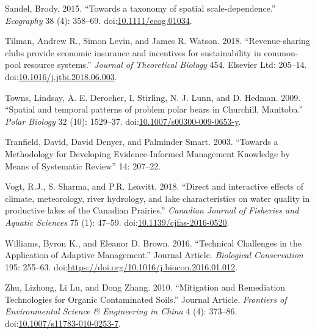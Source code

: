 \documentclass[fleqn,10pt]{wlpeerj} %
\begin{document}
\hypertarget{ref-Sandel2015}{}
Sandel, Brody. 2015. ``Towards a taxonomy of spatial scale-dependence.''
\emph{Ecography} 38 (4): 358--69.
doi:\href{https://doi.org/10.1111/ecog.01034}{10.1111/ecog.01034}.

\hypertarget{ref-Tilman2018}{}
Tilman, Andrew R., Simon Levin, and James R. Watson. 2018.
``Revenue-sharing clubs provide economic insurance and incentives for
sustainability in common-pool resource systems.'' \emph{Journal of
Theoretical Biology} 454. Elsevier Ltd: 205--14.
doi:\href{https://doi.org/10.1016/j.jtbi.2018.06.003}{10.1016/j.jtbi.2018.06.003}.

\hypertarget{ref-Towns2009}{}
Towns, Lindsay, A. E. Derocher, I. Stirling, N. J. Lunn, and D. Hedman.
2009. ``Spatial and temporal patterns of problem polar bears in
Churchill, Manitoba.'' \emph{Polar Biology} 32 (10): 1529--37.
doi:\href{https://doi.org/10.1007/s00300-009-0653-y}{10.1007/s00300-009-0653-y}.

\hypertarget{ref-Tranfield2003}{}
Tranfield, David, David Denyer, and Palminder Smart. 2003. ``Towards a
Methodology for Developing Evidence-Informed Management Knowledge by
Means of Systematic Review'' 14: 207--22.

\hypertarget{ref-Vogt2018}{}
Vogt, R.J., S. Sharma, and P.R. Leavitt. 2018. ``Direct and interactive
effects of climate, meteorology, river hydrology, and lake
characteristics on water quality in productive lakes of the Canadian
Prairies.'' \emph{Canadian Journal of Fisheries and Aquatic Sciences} 75
(1): 47--59.
doi:\href{https://doi.org/10.1139/cjfas-2016-0520}{10.1139/cjfas-2016-0520}.

\hypertarget{ref-Williams2016}{}
Williams, Byron K., and Eleanor D. Brown. 2016. ``Technical Challenges
in the Application of Adaptive Management.'' Journal Article.
\emph{Biological Conservation} 195: 255--63.
doi:\href{https://doi.org/https://doi.org/10.1016/j.biocon.2016.01.012}{https://doi.org/10.1016/j.biocon.2016.01.012}.

\hypertarget{ref-Zhu2010}{}
Zhu, Lizhong, Li Lu, and Dong Zhang. 2010. ``Mitigation and Remediation
Technologies for Organic Contaminated Soils.'' Journal Article.
\emph{Frontiers of Environmental Science \& Engineering in China} 4 (4):
373--86.
doi:\href{https://doi.org/10.1007/s11783-010-0253-7}{10.1007/s11783-010-0253-7}.
\end{document}
